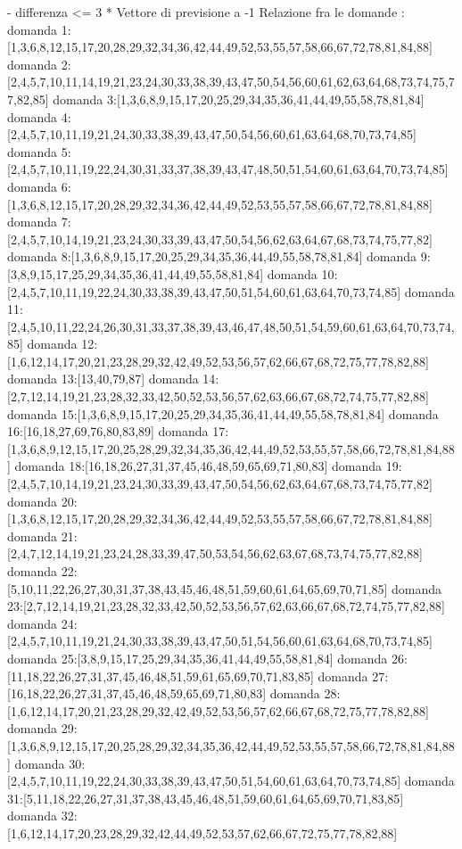 - differenza <= 3
* Vettore di previsione a -1
Relazione fra le domande :
domanda 1:[1,3,6,8,12,15,17,20,28,29,32,34,36,42,44,49,52,53,55,57,58,66,67,72,78,81,84,88]
domanda 2:[2,4,5,7,10,11,14,19,21,23,24,30,33,38,39,43,47,50,54,56,60,61,62,63,64,68,73,74,75,77,82,85]
domanda 3:[1,3,6,8,9,15,17,20,25,29,34,35,36,41,44,49,55,58,78,81,84]
domanda 4:[2,4,5,7,10,11,19,21,24,30,33,38,39,43,47,50,54,56,60,61,63,64,68,70,73,74,85]
domanda 5:[2,4,5,7,10,11,19,22,24,30,31,33,37,38,39,43,47,48,50,51,54,60,61,63,64,70,73,74,85]
domanda 6:[1,3,6,8,12,15,17,20,28,29,32,34,36,42,44,49,52,53,55,57,58,66,67,72,78,81,84,88]
domanda 7:[2,4,5,7,10,14,19,21,23,24,30,33,39,43,47,50,54,56,62,63,64,67,68,73,74,75,77,82]
domanda 8:[1,3,6,8,9,15,17,20,25,29,34,35,36,44,49,55,58,78,81,84]
domanda 9:[3,8,9,15,17,25,29,34,35,36,41,44,49,55,58,81,84]
domanda 10:[2,4,5,7,10,11,19,22,24,30,33,38,39,43,47,50,51,54,60,61,63,64,70,73,74,85]
domanda 11:[2,4,5,10,11,22,24,26,30,31,33,37,38,39,43,46,47,48,50,51,54,59,60,61,63,64,70,73,74,85]
domanda 12:[1,6,12,14,17,20,21,23,28,29,32,42,49,52,53,56,57,62,66,67,68,72,75,77,78,82,88]
domanda 13:[13,40,79,87]
domanda 14:[2,7,12,14,19,21,23,28,32,33,42,50,52,53,56,57,62,63,66,67,68,72,74,75,77,82,88]
domanda 15:[1,3,6,8,9,15,17,20,25,29,34,35,36,41,44,49,55,58,78,81,84]
domanda 16:[16,18,27,69,76,80,83,89]
domanda 17:[1,3,6,8,9,12,15,17,20,25,28,29,32,34,35,36,42,44,49,52,53,55,57,58,66,72,78,81,84,88]
domanda 18:[16,18,26,27,31,37,45,46,48,59,65,69,71,80,83]
domanda 19:[2,4,5,7,10,14,19,21,23,24,30,33,39,43,47,50,54,56,62,63,64,67,68,73,74,75,77,82]
domanda 20:[1,3,6,8,12,15,17,20,28,29,32,34,36,42,44,49,52,53,55,57,58,66,67,72,78,81,84,88]
domanda 21:[2,4,7,12,14,19,21,23,24,28,33,39,47,50,53,54,56,62,63,67,68,73,74,75,77,82,88]
domanda 22:[5,10,11,22,26,27,30,31,37,38,43,45,46,48,51,59,60,61,64,65,69,70,71,85]
domanda 23:[2,7,12,14,19,21,23,28,32,33,42,50,52,53,56,57,62,63,66,67,68,72,74,75,77,82,88]
domanda 24:[2,4,5,7,10,11,19,21,24,30,33,38,39,43,47,50,51,54,56,60,61,63,64,68,70,73,74,85]
domanda 25:[3,8,9,15,17,25,29,34,35,36,41,44,49,55,58,81,84]
domanda 26:[11,18,22,26,27,31,37,45,46,48,51,59,61,65,69,70,71,83,85]
domanda 27:[16,18,22,26,27,31,37,45,46,48,59,65,69,71,80,83]
domanda 28:[1,6,12,14,17,20,21,23,28,29,32,42,49,52,53,56,57,62,66,67,68,72,75,77,78,82,88]
domanda 29:[1,3,6,8,9,12,15,17,20,25,28,29,32,34,35,36,42,44,49,52,53,55,57,58,66,72,78,81,84,88]
domanda 30:[2,4,5,7,10,11,19,22,24,30,33,38,39,43,47,50,51,54,60,61,63,64,70,73,74,85]
domanda 31:[5,11,18,22,26,27,31,37,38,43,45,46,48,51,59,60,61,64,65,69,70,71,83,85]
domanda 32:[1,6,12,14,17,20,23,28,29,32,42,44,49,52,53,57,62,66,67,72,75,77,78,82,88]
